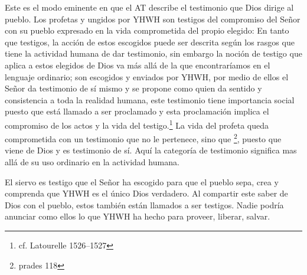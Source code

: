 Este es el modo eminente en que el AT describe el testimonio que Dios dirige al
pueblo. Los profetas y ungidos por YHWH son testigos del compromiso del Señor
con su pueblo expresado en la vida comprometida del propio elegido:
En tanto que testigos, la acción de estos escogidos puede ser descrita según los
rasgos que tiene la actividad humana de dar testimonio, sin embargo la noción de
testigo que aplica a estos elegidos de Dios va más allá de la que encontraríamos
en el lenguaje ordinario; son escogidos y enviados por YHWH, por medio de ellos
el Señor da testimonio de sí mismo y se propone como quien da sentido y
consistencia a toda la realidad humana, este testimonio tiene importancia social
puesto que está llamado a ser proclamado y esta proclamación implica el
compromiso de los actos y la vida del testigo.\footnote{cf. Latourelle
  1526--1527} La vida del profeta queda comprometida con un testimonio que no le
pertenece, sino que \footnote{prades 118}, puesto
que viene de Dios y es testimonio de sí. Aquí la categoría de testimonio
significa mas allá de su uso ordinario en la actividad humana.


El siervo es testigo que el Señor ha escogido para que el pueblo sepa, crea y
comprenda que YHWH es el único Dios verdadero. Al compartir este saber de Dios
con el pueblo, estos también están llamados a ser testigos. Nadie podría
anunciar como ellos lo que YHWH ha hecho para proveer, liberar, salvar.

